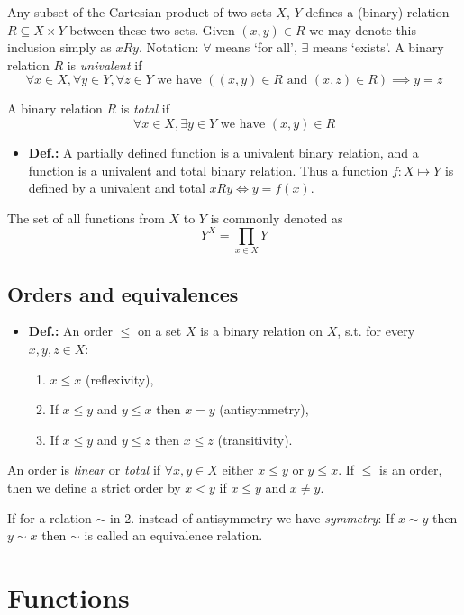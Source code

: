 \documentclass{article}
\begin{document}
Any subset of the Cartesian product of two sets $X$, $Y$ defines a (binary) relation $R \subseteq X \times Y $ between these two sets. Given $(x, y) \in R$ we may denote this inclusion simply as $xRy$. 
   Notation: $\forall$ means ‘for all’, $\exists$ means ‘exists’.
A binary relation $R$ is \textit{univalent} if
\[
\forall x \in X, \forall y \in Y, \forall z \in Y \text{ we have } ((x, y) \in R \text{ and } (x, z)\in R) \implies y = z
\]

A binary relation $R$ is \textit{total} if
\[
\forall x \in X, \exists y \in Y \text{ we have } (x,y) \in R
\]

\begin{itemize}
\item \textbf{Def.:} A partially defined function is a univalent binary relation, and a function is a univalent and total binary relation. Thus a function $f: X \mapsto Y$ is defined by a univalent and total $xRy\iff y = f(x)$.
\end{itemize}
The set of all functions from $X$ to $Y$ is commonly denoted as 
\[
Y^X = \prod_{x\in X}Y
\]

\subsection{Orders and equivalences}
\begin{itemize}
\item \textbf{Def.:} An order $\leq$ on a set $X$ is a binary relation on $X$, s.t. for every $x, y, z \in X$:
\begin{enumerate}
    \item $x \leq x$ (reflexivity),
    \item If $x \leq y$ and $y \leq x$ then $x=y$ (antisymmetry),
    \item If $x \leq y$ and $y\leq z$ then $x\leq z$ (transitivity).
\end{enumerate}
\end{itemize}

An order is \textit{linear} or \textit{total} if $\forall x,y\in X$ either $x\leq y$ or $y\leq x$. If $\leq$ is an order, then we define a strict order by $x < y$ if $x\leq y$ and $x\neq y$.

If for a relation $\sim$ in 2. instead of antisymmetry we have \textit{symmetry}: 
If $x\sim y$ then $y\sim x$
then $\sim$ is called an equivalence relation.

\section{Functions}
\end{document}
